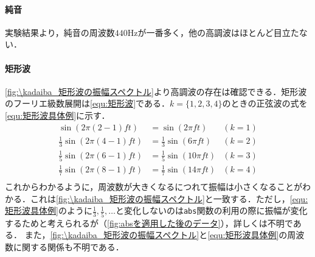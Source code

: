 \paragraph{純音}実験結果より，純音の周波数\(440\textrm{Hz}\)が一番多く，他の高調波はほとんど目立たない．
\paragraph{矩形波}\ref{fig:\kadaiba_矩形波の振幅スペクトル}より高調波の存在は確認できる．矩形波のフーリエ級数展開は\eqref{equ:矩形波}である．\(k=\{1,2,3,4\}\)のときの正弦波の式を\eqref{equ:矩形波具体例}に示す．
\begin{equation}
    \begin{aligned}
        \sin(2\pi(2-1)ft)            & =\sin(2\pi ft)             & (k=1) \\
        \frac{1}{3}\sin(2\pi(4-1)ft) & =\frac{1}{3}\sin(6\pi ft)  & (k=2) \\
        \frac{1}{5}\sin(2\pi(6-1)ft) & =\frac{1}{5}\sin(10\pi ft) & (k=3) \\
        \frac{1}{7}\sin(2\pi(8-1)ft) & =\frac{1}{7}\sin(14\pi ft) & (k=4) \\
    \end{aligned}\label{equ:矩形波具体例}
\end{equation}
これからわかるように，周波数が大きくなるにつれて振幅は小さくなることがわかる．これは\ref{fig:\kadaiba_矩形波の振幅スペクトル}と一致する．ただし，\eqref{equ:矩形波具体例}のように\(\frac{1}{3}, \frac{1}{5},\dots\)と変化しないのは\texttt{abs}関数の利用の際に振幅が変化するためと考えられるが（\ref{fig:absを適用した後のデータ}），詳しくは不明である．
また，\ref{fig:\kadaiba_矩形波の振幅スペクトル}と\eqref{equ:矩形波具体例}の周波数に関する関係も不明である．
\section{\kadaibb}\label{sec:\kadaibb}